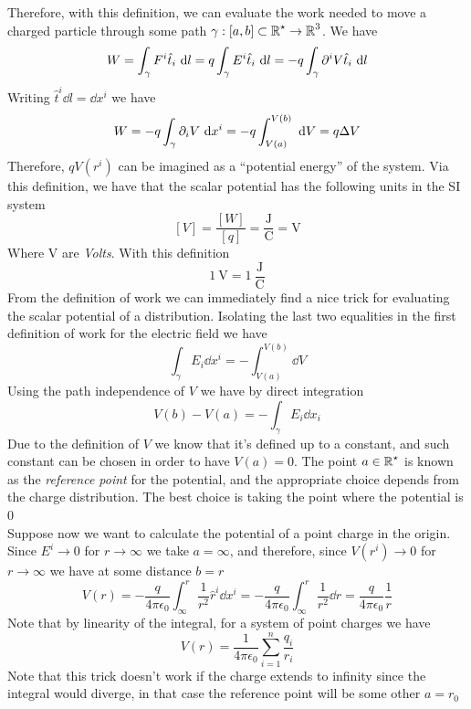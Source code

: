 \documentclass[../electromagnetism]{subfiles}
\begin{document}
Therefore, with this definition, we can evaluate the work needed to move a charged particle through some path $\gamma:[a,b]\subset\operatorname{\mathbb{R}}^\star\to\operatorname{\mathbb{R}}^3$. We have
\begin{equation*}
	W=\int_{\gamma}^{}F^i\hat{t}_i\ \mathrm{d} l=q\int_{\gamma}^{}E^i\hat{t}_i\ \mathrm{d} l=-q\int_{\gamma}^{}\partial^i V\hat{t}_i\ \mathrm{d} l
\end{equation*}
Writing $\hat{t}^i\dd l=\dd x^i$ we have
\begin{equation}
	W=-q\int_{\gamma}\partial_iV\ \mathrm{d} x^i=-q\int_{V(a)}^{V(b)}\ \mathrm{d} V=q\Delta V
	\label{eq:visvivaes}
\end{equation}
Therefore, $qV(r^i)$ can be imagined as a ``potential energy'' of the system. Via this definition, we have that the scalar potential has the following units in the SI system
\begin{equation}
	\left[ V \right]=\frac{\left[ W \right]}{\left[ q \right]}=\mathrm{\frac{J}{C}}=\mathrm{V}
	\label{eq:voltsdef}
\end{equation}
Where $\mathrm{V}$ are \textit{Volts}. With this definition
\begin{equation}
	1\ \mathrm{V}=1\ \mathrm{\frac{J}{C}}
	\label{eq:voltdef}
\end{equation}
From the definition of work we can immediately find a nice trick for evaluating the scalar potential of a distribution. Isolating the last two equalities in the first definition of work for the electric field we have
\begin{equation}
	\int_{\gamma}^{}E_i\dd x^i=-\int_{V(a)}^{V(b)}\dd V
	\label{eq:Vpathindep}
\end{equation}
Using the path independence of $V$ we have by direct integration
\begin{equation}
	V(b)-V(a)=-\int_{\gamma}^{}E_i\dd x_i
	\label{eq:trickV}
\end{equation}
Due to the definition of $V$ we know that it's defined up to a constant, and such constant can be chosen in order to have $V(a)=0$. The point $a\in\operatorname{\mathbb{R}}^\star$ is known as the \textit{reference point} for the potential, and the appropriate choice depends from the charge distribution. The best choice is taking the point where the potential is 0\\
Suppose now we want to calculate the potential of a point charge in the origin. Since $E^i\to0$ for $r\to\infty$ we take $a=\infty$, and therefore, since $V(r^i)\to0$ for $r\to\infty$ we have at some distance $b=r$
\begin{equation}
	V(r)=-\frac{q}{4\pi\epsilon_0}\int_{\infty}^{r}\frac{1}{r^2}\hat{r}^i\dd x^i=-\frac{q}{4\pi\epsilon_0}\int_{\infty}^{r}\frac{1}{r^2}\dd r=\frac{q}{4\pi\epsilon_0}\frac{1}{r}
	\label{eq:qoriginpot}
\end{equation}
Note that by linearity of the integral, for a system of point charges we have
\begin{equation}
	V(r)=\frac{1}{4\pi\epsilon_0}\sum_{i=1}^n\frac{q_i}{r_i}
	\label{eq:systemchargespot}
\end{equation}
Note that this trick doesn't work if the charge extends to infinity since the integral would diverge, in that case the reference point will be some other $a=r_0$
\end{document}

